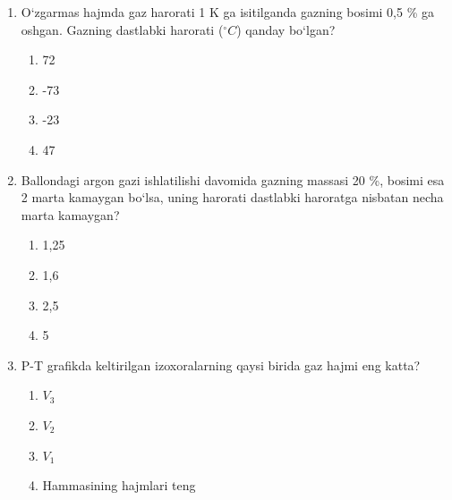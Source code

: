 \begin{enumerate}
\item O‘zgarmas hajmda gaz harorati 1 K ga isitilganda gazning bosimi 0,5 \% ga oshgan. Gazning dastlabki harorati ($^\circ C$) qanday bo‘lgan?
\begin{enumerate}[label=\Alph*)]
\item 72
\item -73
\item -23
\item 47
\end{enumerate}

\item Ballondagi argon gazi ishlatilishi davomida gazning massasi 20 \%, bosimi esa 2 marta kamaygan bo‘lsa, uning harorati dastlabki haroratga nisbatan necha marta kamaygan?
\begin{enumerate}[label=\Alph*)]
\item 1,25
\item 1,6
\item 2,5
\item 5
\end{enumerate}

\item P-T grafikda keltirilgan izoxoralarning qaysi birida gaz hajmi eng katta?


\begin{enumerate}[label=\Alph*)]
\item $V_3$
\item $V_2$
\item $V_1$
\item Hammasining hajmlari teng
\end{enumerate}


\end{enumerate}
